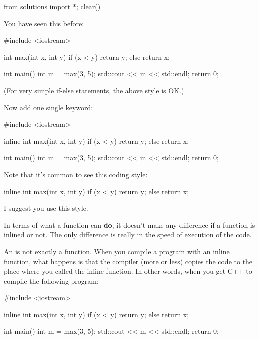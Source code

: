 \begin{python0}
from solutions import *; clear()
\end{python0}

You have seen this before:

\begin{consolethree}[escapeinside=||]
#include <iostream>

int max(int x, int y)
{
    if (x < y) return y;
    else return x;
}

int main()
{
    int m = max(3, 5);
    std::cout << m << std::endl;
    return 0;
}
\end{consolethree}

(For very simple if-else statements, the above style is OK.)

Now add one single keyword:

\begin{consolethree}[escapeinside=||]
#include <iostream>

inline int max(int x, int y)
{
    if (x < y) return y;
    else return x;
}

int main()
{
    int m = max(3, 5);
    std::cout << m << std::endl;
    return 0;
}
\end{consolethree}

Note that it's common to see this coding style:

\begin{consolethree}[escapeinside=||]
inline
int max(int x, int y)
{
    if (x < y) return y;
    else return x;
}
\end{consolethree}

I suggest you use this style.

In terms of what a function can \textbf{do}, it doesn't make any difference if a function is inlined or not. The only difference is really in the speed of execution of the code.

An  is not exactly a function. When you compile a program with an inline function, what happens is that the compiler (more or less) copies the code to the place where you called the inline function. In other words, when you get C++ to compile the following program:

\begin{consolethree}[escapeinside=||]
#include <iostream>

inline
int max(int x, int y)
{
    if (x < y) return y;
    else return x;
}

int main()
{
    int m = max(3, 5);
    std::cout << m << std::endl;
    return 0;
}
\end{consolethree}

